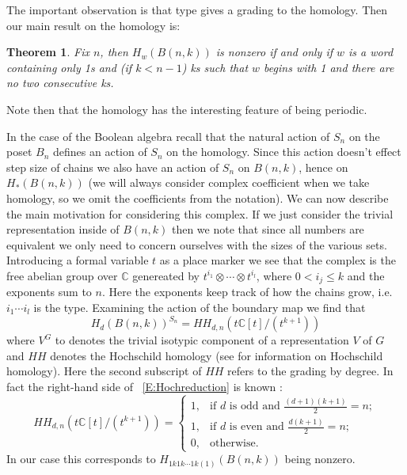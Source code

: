 \documentclass{article}
\newtheorem{theorem}{Theorem}[section]
\newcommand{\C}{\mathbb{C}}
\begin{document}
The important observation is that type gives a grading to the homology. Then our main result on the homology is:
\begin{theorem}\label{T:Main}
 Fix $n$, then $H_w(B(n,k))$ is nonzero if and only if $w$ is a word containing only 1s and (if $k <n-1$) ks such that
 $w$ begins with 1 and there are no two consecutive ks.
\end{theorem} 
Note then that the homology has the interesting feature of being periodic. 

In the case of the Boolean algebra recall that
the natural action of $S_n$ on the poset $B_n$ defines an action of $S_n$ on the homology. Since this action doesn't 
effect step size of chains we also have an action of $S_n$ on $B(n, k)$, hence on $H_*(B(n, k))$ (we will always consider
complex coefficient when we take homology, so we omit the coefficients from the notation). We can now describe the
main motivation for considering this complex. If we just consider the trivial representation inside of $B(n, k)$ then we
note that since all numbers are equivalent we only need to concern ourselves with the sizes of the various sets. 
Introducing a formal variable $t$ as a place marker we see that the complex is the free abelian group over $\C$ genereated
by $t^{i_1}\otimes \cdots \otimes t^{i_l}$, where $0 <i_j \le k$ and the exponents sum to $n$.
 Here the exponents keep track of how the chains grow, 
i.e. $i_1 \cdots i_l$ is the type. Examining the action of the boundary map we find that
\begin{equation} \label{E:Hochreduction}
  H_d(B(n, k))^{S_n} = HH_{d, n}(t\C[t]/(t^{k+1}))
\end{equation}
where $V^G$ to denotes the trivial isotypic component of a representation $V$ of $G$ and $HH$ denotes the Hochschild 
homology (see \cite{Weibel} for information on Hochschild homology). Here the second 
subscript of $HH$ refers to the grading by degree. In fact the right-hand side of ~\ref{E:Hochreduction} is known 
\cite{HanlonMac}:
\begin{equation} \label{E:HH}
  HH_{d, n}(t\C[t]/(t^{k+1})) = 
  \begin{cases} 
   1, &\text{if $d$ is odd and $\frac{(d+1)(k+1)}{2} = n;$}\\
   1, &\text{if $d$ is even and $\frac{d(k+1)}{2} = n;$}\\
   0, &\text{otherwise.}
  \end{cases}
\end{equation}
In our case this corresponds to $H_{1k1k\cdots1k(1)}(B(n, k))$ being nonzero.
\end{document}
